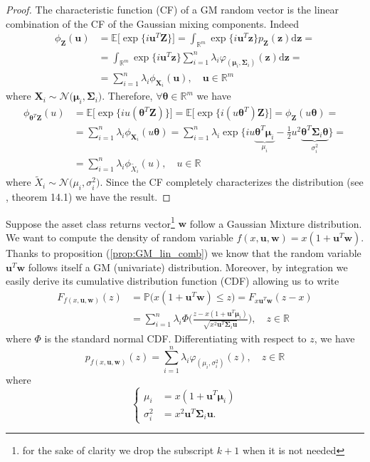 \begin{proof}
	The characteristic function (CF) of a GM random vector is the linear combination of the CF of the Gaussian mixing components. Indeed 
	\begin{align*}
	\phi_{\bm{Z}}(\bm{u}) &= \mathbb{E}\big[\exp\{i \bm{u}^T \bm{Z}\} \big] = \int_{\mathbb{R}^m}\exp\{i \bm{u}^T \bm{z}\}p_{\bm{Z}}(\bm{z})\mathrm{d}\bm{z} = \\
	& = \int_{\mathbb{R}^m}\exp\{i \bm{u}^T \bm{z}\}\sum_{i=1}^{n}\lambda_i \varphi_{(\bm{\mu}_i,\bm{\Sigma}_i)}(\bm{z})\mathrm{d}\bm{z} = \\
	& = \sum_{i=1}^{n}\lambda_i \phi_{\bm{X}_i}(\bm{u}), \quad \bm{u} \in \mathbb{R}^m
	\end{align*}
	where $\bm{X}_i \sim \mathcal{N}\big(\bm{\mu}_i,\bm{\Sigma}_i\big)$. Therefore, $\forall \bm{\theta} \in \mathbb{R}^m$ we have
	\begin{align*}
	\phi_{\bm{\theta}^T \bm{Z}}(u) & = \mathbb{E}\big[\exp\{iu(\bm{\theta}^T\bm{Z})\}\big] = \mathbb{E}\big[\exp\{i(u\bm{\theta}^T)\bm{Z}\}\big] = 
    \phi_{\bm{Z}}(u\bm{\theta}) = \\
    & = \sum_{i=1}^{n}\lambda_i \phi_{\bm{X}_i}(u\bm{\theta}) = \sum_{i=1}^{n}\lambda_i \exp\{iu\underbrace{\bm{\theta}^T\bm{\mu}_i}_{\mu_i}-\frac{1}{2}u^2\underbrace{\bm{\theta}^T\bm{\Sigma}_i\bm{\theta}}_{\sigma_i^2}\} = \\
	& = \sum_{i=1}^{n}\lambda_i \phi_{\widetilde{X}_i}(u), \quad u \in \mathbb{R}
	\end{align*}
	where $\widetilde{X}_i \sim \mathcal{N}\big(\mu_i,\sigma_i^2 \big)$. Since the CF completely characterizes the distribution (see \cite{jacod2000probability}, theorem 14.1) we have the result.
\end{proof}
Suppose the asset class returns vector\footnote{for the sake of clarity we drop the subscript $k+1$ when it is not needed} $\bm{w}$ follow a Gaussian Mixture distribution. We want to compute the density of random variable $f(x,\bm{u},\bm{w}) = x(1 + \bm{u}^T\bm{w})$. Thanks to proposition (\ref{prop:GM_lin_comb}) we know that the random variable $\bm{u}^T\bm{w}$ follows itself a GM (univariate) distribution. Moreover, by integration we easily derive its cumulative distribution function (CDF) allowing us to write
\begin{align*}
F_{f(x,\bm{u},\bm{w})}(z) & = \mathbb{P}\big(x(1+\bm{u}^T\bm{w})\leq z \big) = F_{x\bm{u}^T\bm{w}}(z-x)\\
& = \sum_{i=1}^{n}\lambda_i \Phi\Big(\frac{z - x(1+\bm{u}^T\bm{\mu}_i)}{\sqrt{x^2\bm{u}^T\bm{\Sigma}_i\bm{u}}}\Big), \quad z \in \mathbb{R}
\end{align*}
where $\Phi$ is the standard normal CDF. Differentiating with respect to $z$, we have
\begin{equation}
\boxed{p_{f(x,\bm{u},\bm{w})}(z) = \sum_{i=1}^{n}\lambda_i \varphi_{(\mu_i,\sigma_i^2)}(z), \quad z \in \mathbb{R}}
\end{equation}
where 
\[
\begin{cases}
	\mu_i &= x(1+\bm{u}^T \bm{\mu}_i) \\
	\sigma_i^2 & = x^2\bm{u}^T\bm{\Sigma}_i \bm{u}.
\end{cases}
\]


